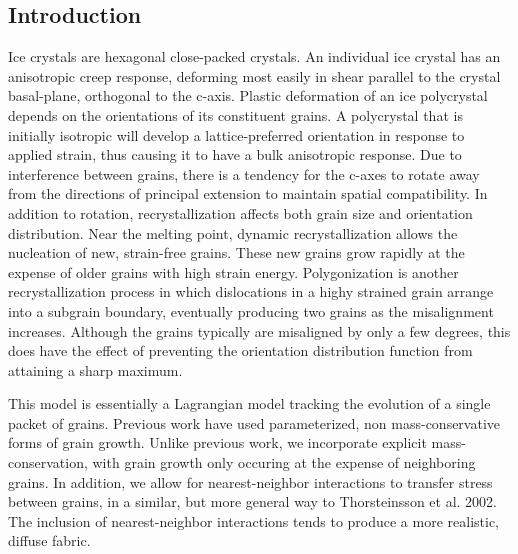 \documentclass[a0,landscape]{a0poster}
\begin{document}
\begin{multicols}{3}
\section*{Introduction}
Ice crystals are hexagonal close-packed crystals. An individual ice crystal has an anisotropic creep response, deforming most easily in shear parallel to the crystal basal-plane, orthogonal to the c-axis. Plastic deformation of an ice polycrystal depends on the orientations of its constituent grains. A polycrystal that is initially isotropic will develop a lattice-preferred orientation in response to applied strain, thus causing it to have a bulk anisotropic response. Due to interference between grains, there is a tendency for the c-axes to rotate away from the directions of principal extension to maintain spatial compatibility. In addition to rotation, recrystallization affects both grain size and orientation distribution. Near the melting point, dynamic recrystallization allows the nucleation of new, strain-free grains. These new grains grow rapidly at the expense of older grains with high strain energy. Polygonization is another recrystallization process in which dislocations in a highy strained grain arrange into a subgrain boundary, eventually producing two grains as the misalignment increases. Although the grains typically are misaligned by only a few degrees, this does have the effect of preventing the orientation distribution function from attaining a sharp maximum.

This model is essentially a Lagrangian model tracking the evolution of a single packet of grains. Previous work have used parameterized, non mass-conservative forms of grain growth. Unlike previous work, we incorporate explicit mass-conservation, with grain growth only occuring at the expense of neighboring grains. In addition, we allow for nearest-neighbor interactions to transfer stress between grains, in a similar, but more general way to Thorsteinsson et al. 2002. The inclusion of nearest-neighbor interactions tends to produce a more realistic, diffuse fabric.   

\color{DarkSlateGray} %



\end{multicols}
\end{document}
